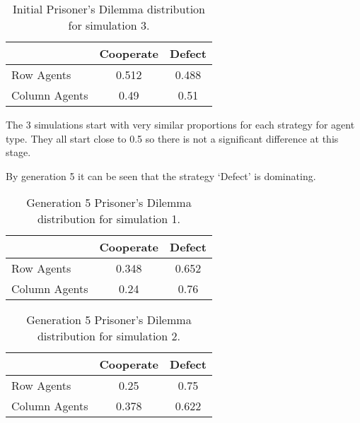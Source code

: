 \begin{table}[H]
\begin{center}
\begin{tabular}{|l|c|c|}
\hline
& Cooperate & Defect \\ 
\hline
Row Agents & 0.512 & 0.488\\
\hline
Column Agents & 0.49 & 0.51\\
\hline
\end{tabular}
\end{center}
\caption{ Initial Prisoner’s Dilemma distribution for simulation 3.}
\label{tab:pds3g1}
\end{table}

 The 3 simulations start with very similar proportions for each strategy for agent type. They all start close to 0.5 so there is not a significant difference at this stage.

By generation 5 it can be seen that the strategy `Defect' is dominating.

\begin{table}[H]
\begin{center}
\begin{tabular}{|l|c|c|}
\hline
& Cooperate & Defect \\ 
\hline
Row Agents & 0.348 & 0.652\\
\hline
Column Agents & 0.24 & 0.76\\
\hline
\end{tabular}
\end{center}
\caption{ Generation 5 Prisoner’s Dilemma distribution for simulation 1.}
\label{tab:pds1g5}
\end{table}

\begin{table}[H]
\begin{center}
\begin{tabular}{|l|c|c|}
\hline
& Cooperate & Defect \\ 
\hline
Row Agents & 0.25 & 0.75\\
\hline
Column Agents & 0.378 & 0.622\\
\hline
\end{tabular}
\end{center}
\caption{Generation 5 Prisoner’s Dilemma distribution for simulation 2.}
\label{tab:pds2g5}
\end{table}

